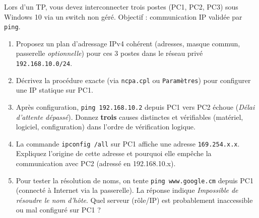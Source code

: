 \documentclass[11pt]{article}
\begin{document}
\begin{exercice}
Lors d'un TP, vous devez interconnecter trois postes (PC1, PC2, PC3) sous Windows 10 via un switch non géré. Objectif : communication IP validée par \texttt{ping}.

\begin{enumerate}
    \item Proposez un plan d'adressage IPv4 cohérent (adresses, masque commun, passerelle \textit{optionnelle}) pour ces 3 postes dans le réseau privé \texttt{192.168.10.0/24}.
    \item Décrivez la procédure exacte (via \texttt{ncpa.cpl} ou \texttt{Paramètres}) pour configurer une IP statique sur PC1.
    \item Après configuration, \texttt{ping 192.168.10.2} depuis PC1 vers PC2 échoue (\textit{Délai d'attente dépassé}). Donnez \textbf{trois} causes distinctes et vérifiables (matériel, logiciel, configuration) dans l'ordre de vérification logique.
    \item La commande \texttt{ipconfig /all} sur PC1 affiche une adresse \texttt{169.254.x.x}. Expliquez l'origine de cette adresse et pourquoi elle empêche la communication avec PC2 (adressé en 192.168.10.x).
    \item Pour tester la résolution de noms, on tente \texttt{ping www.google.cm} depuis PC1 (connecté à Internet via la passerelle). La réponse indique \textit{Impossible de résoudre le nom d'hôte}. Quel serveur (rôle/IP) est probablement inaccessible ou mal configuré sur PC1 ?
\end{enumerate}
\end{exercice}
\end{document}
